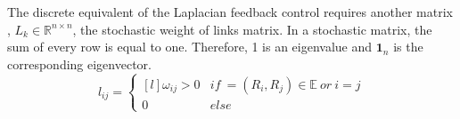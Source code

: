 \documentclass[a4paper, 12pt]{report}
\begin{document}
%
The discrete equivalent of the Laplacian feedback control requires another matrix \cite{Moreau2005}, $L_k \in \mathbb{R}^{n \times n}$, the stochastic weight of links matrix. In a stochastic matrix, the sum of every row is equal to one. Therefore, 1 is an eigenvalue and $\boldsymbol{1}_n$ is the corresponding eigenvector.
\[l_{ij} =  \left\{ \begin{matrix*}[l] \omega_{ij} > 0 & if\  = (R_i, R_j) \in \mathbb{E}\ or\ i=j\\ 0 & else \end{matrix*} \right.\]
%
%
\end{document}
